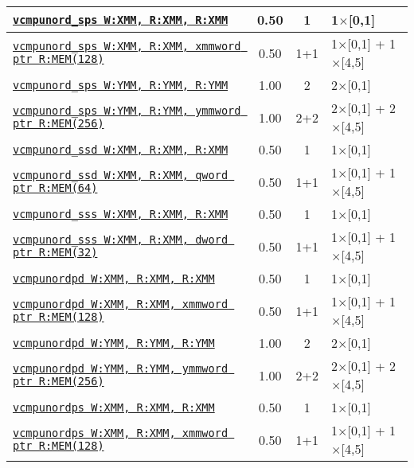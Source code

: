 \documentclass[a4paper,english,fontsize=9]{scrartcl}
\begin{document}
\begin{longtable}{p{}ccL{.25\textwidth}}
  \midrule
  \texttt{\href{https://felixcloutier.com/x86/CMPPS.html}{vcmpunord\_sps W:XMM, R:XMM, R:XMM}} & 0.50 & 1 & 1\(\times\)[0,1] \\
  \midrule
  \texttt{\href{https://felixcloutier.com/x86/CMPPS.html}{vcmpunord\_sps W:XMM, R:XMM, xmmword ptr R:MEM(128)}} & 0.50 & 1+1 & 1\(\times\)[0,1] + 1\(\times\)[4,5] \\
  \midrule
  \texttt{\href{https://felixcloutier.com/x86/CMPPS.html}{vcmpunord\_sps W:YMM, R:YMM, R:YMM}} & 1.00 & 2 & 2\(\times\)[0,1] \\
  \midrule
  \texttt{\href{https://felixcloutier.com/x86/CMPPS.html}{vcmpunord\_sps W:YMM, R:YMM, ymmword ptr R:MEM(256)}} & 1.00 & 2+2 & 2\(\times\)[0,1] + 2\(\times\)[4,5] \\
  \midrule
  \texttt{\href{https://felixcloutier.com/x86/CMPSD.html}{vcmpunord\_ssd W:XMM, R:XMM, R:XMM}} & 0.50 & 1 & 1\(\times\)[0,1] \\
  \midrule
  \texttt{\href{https://felixcloutier.com/x86/CMPSD.html}{vcmpunord\_ssd W:XMM, R:XMM, qword ptr R:MEM(64)}} & 0.50 & 1+1 & 1\(\times\)[0,1] + 1\(\times\)[4,5] \\
  \midrule
  \texttt{\href{https://felixcloutier.com/x86/CMPSS.html}{vcmpunord\_sss W:XMM, R:XMM, R:XMM}} & 0.50 & 1 & 1\(\times\)[0,1] \\
  \midrule
  \texttt{\href{https://felixcloutier.com/x86/CMPSS.html}{vcmpunord\_sss W:XMM, R:XMM, dword ptr R:MEM(32)}} & 0.50 & 1+1 & 1\(\times\)[0,1] + 1\(\times\)[4,5] \\
  \midrule
  \texttt{\href{https://felixcloutier.com/x86/CMPPD.html}{vcmpunordpd W:XMM, R:XMM, R:XMM}} & 0.50 & 1 & 1\(\times\)[0,1] \\
  \midrule
  \texttt{\href{https://felixcloutier.com/x86/CMPPD.html}{vcmpunordpd W:XMM, R:XMM, xmmword ptr R:MEM(128)}} & 0.50 & 1+1 & 1\(\times\)[0,1] + 1\(\times\)[4,5] \\
  \midrule
  \texttt{\href{https://felixcloutier.com/x86/CMPPD.html}{vcmpunordpd W:YMM, R:YMM, R:YMM}} & 1.00 & 2 & 2\(\times\)[0,1] \\
  \midrule
  \texttt{\href{https://felixcloutier.com/x86/CMPPD.html}{vcmpunordpd W:YMM, R:YMM, ymmword ptr R:MEM(256)}} & 1.00 & 2+2 & 2\(\times\)[0,1] + 2\(\times\)[4,5] \\
  \midrule
  \texttt{\href{https://felixcloutier.com/x86/CMPPS.html}{vcmpunordps W:XMM, R:XMM, R:XMM}} & 0.50 & 1 & 1\(\times\)[0,1] \\
  \midrule
  \texttt{\href{https://felixcloutier.com/x86/CMPPS.html}{vcmpunordps W:XMM, R:XMM, xmmword ptr R:MEM(128)}} & 0.50 & 1+1 & 1\(\times\)[0,1] + 1\(\times\)[4,5] \\

\end{longtable}
\end{document}
